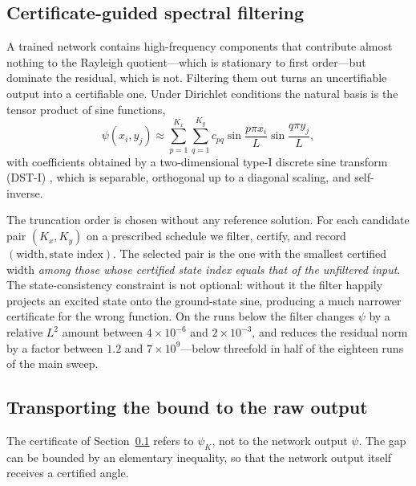 \subsection{Certificate-guided spectral filtering}
\label{sec:filter}

A trained network contains high-frequency components that contribute almost
nothing to the Rayleigh quotient---which is stationary to first order---but
dominate the residual, which is not. Filtering them out turns an
uncertifiable output into a certifiable one. Under Dirichlet conditions the
natural basis is the tensor product of sine functions,
\begin{equation}
  \psi(x_i,y_j)\approx\sum_{p=1}^{K_x}\sum_{q=1}^{K_y} c_{pq}
  \sin\frac{p\pi x_i}{L}\sin\frac{q\pi y_j}{L},
  \label{eq:dst}
\end{equation}
with coefficients obtained by a two-dimensional type-I discrete sine
transform (DST-I) \citep{boyd2001}, which is separable, orthogonal up to a
diagonal scaling, and self-inverse.

The truncation order is chosen without any reference solution. For each
candidate pair $(K_x,K_y)$ on a prescribed schedule we filter, certify, and
record $(\text{width}, \text{state index})$. The selected pair is the one with
the smallest certified width \emph{among those whose certified state index
equals that of the unfiltered input}. The state-consistency constraint is not
optional: without it the filter happily projects an excited state onto the
ground-state sine, producing a much narrower certificate for the wrong
function. On the runs below the filter changes $\psi$ by a relative $L^2$
amount between $4\times10^{-6}$ and $2\times10^{-3}$, and reduces the residual
norm by a factor between $1.2$ and $7\times10^{9}$---below threefold in half
of the eighteen runs of the main sweep.

\subsection{Transporting the bound to the raw output}
\label{sec:transport}

The certificate of Section~\ref{sec:filter} refers to $\psi_K$, not to the
network output $\psi$. The gap can be bounded by an elementary inequality, so
that the network output itself receives a certified angle.

